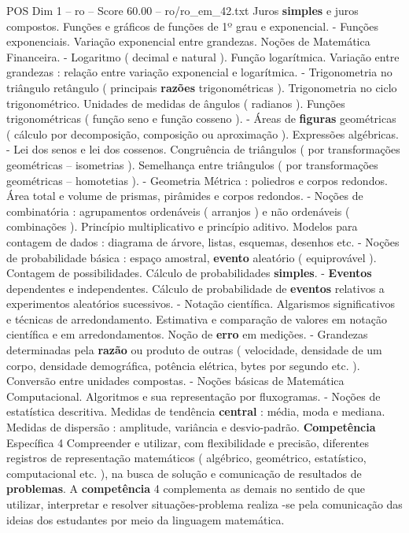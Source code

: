 \begin{textsample}{POS Dim 1 – ro – Score 60.00 – ro/ro\_em\_42.txt}
Juros \textbf{simples} e juros compostos.
Funções e gráficos de funções de 1º grau e exponencial. - Funções exponenciais.
Variação exponencial entre grandezas.
Noções de Matemática Financeira. - Logaritmo ( decimal e natural ).
Função logarítmica.
Variação entre grandezas : relação entre variação exponencial e logarítmica. - Trigonometria no triângulo retângulo ( principais \textbf{razões} trigonométricas ).
Trigonometria no ciclo trigonométrico.
Unidades de medidas de ângulos ( radianos ).
Funções trigonométricas ( função seno e função cosseno ). - Áreas de \textbf{figuras} geométricas ( cálculo por decomposição, composição ou aproximação ).
Expressões algébricas. - Lei dos senos e lei dos cossenos.
Congruência de triângulos ( por transformações geométricas – isometrias ).
Semelhança entre triângulos ( por transformações geométricas – homotetias ). - Geometria Métrica : poliedros e corpos redondos.
Área total e volume de prismas, pirâmides e corpos redondos. - Noções de combinatória : agrupamentos ordenáveis ( arranjos ) e não ordenáveis ( combinações ).
Princípio multiplicativo e princípio aditivo.
Modelos para contagem de dados : diagrama de árvore, listas, esquemas, desenhos etc. - Noções de probabilidade básica : espaço amostral, \textbf{evento} aleatório ( equiprovável ).
Contagem de possibilidades.
Cálculo de probabilidades \textbf{simples}. - \textbf{Eventos} dependentes e independentes.
Cálculo de probabilidade de \textbf{eventos} relativos a experimentos aleatórios sucessivos. - Notação científica.
Algarismos significativos e técnicas de arredondamento.
Estimativa e comparação de valores em notação científica e em arredondamentos.
Noção de \textbf{erro} em medições. - Grandezas determinadas pela \textbf{razão} ou produto de outras ( velocidade, densidade de um corpo, densidade demográfica, potência elétrica, bytes por segundo etc. ).
Conversão entre unidades compostas. - Noções básicas de Matemática Computacional.
Algoritmos e sua representação por fluxogramas. - Noções de estatística descritiva.
Medidas de tendência \textbf{central} : média, moda e mediana.
Medidas de dispersão : amplitude, variância e desvio-padrão. \textbf{Competência} Específica 4 Compreender e utilizar, com flexibilidade e precisão, diferentes registros de representação matemáticos ( algébrico, geométrico, estatístico, computacional etc. ), na busca de solução e comunicação de resultados de \textbf{problemas}.
A \textbf{competência} 4 complementa as demais no sentido de que utilizar, interpretar e resolver situações-problema realiza -se pela comunicação das ideias dos estudantes por meio da linguagem matemática.

\end{textsample}
